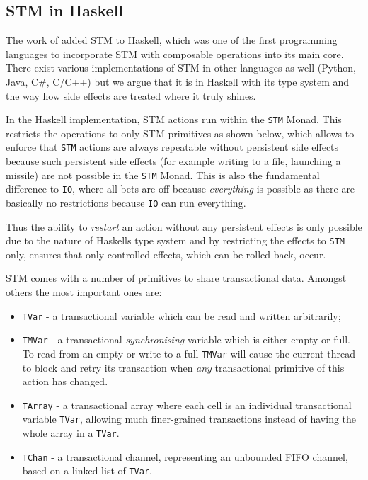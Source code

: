 \subsection{STM in Haskell}
The work of \cite{harris_composable_2005, harris_transactional_2006} added STM to Haskell, which was one of the first programming languages to incorporate STM with composable operations into its main core. There exist various implementations of STM in other languages as well (Python, Java, C\#, C/C++) but we argue that it is in Haskell with its type system and the way how side effects are treated where it truly shines.

In the Haskell implementation, STM actions run within the \texttt{STM} Monad. This restricts the operations to only STM primitives as shown below, which allows to enforce that \texttt{STM} actions are always repeatable without persistent side effects because such persistent side effects (for example writing to a file, launching a missile) are not possible in the \texttt{STM} Monad. This is also the fundamental difference to \texttt{IO}, where all bets are off because \textit{everything} is possible as there are basically no restrictions because \texttt{IO} can run everything.

Thus the ability to \textit{restart} an action without any persistent effects is only possible due to the nature of Haskells type system and by restricting the effects to \texttt{STM} only, ensures that only controlled effects, which can be rolled back, occur.

STM comes with a number of primitives to share transactional data. Amongst others the most important ones are:

\begin{itemize}
	\item \texttt{TVar} - a transactional variable which can be read and written arbitrarily;
	\item \texttt{TMVar} - a transactional \textit{synchronising} variable which is either empty or full. To read from an empty or write to a full \texttt{TMVar} will cause the current thread to block and retry its transaction when \textit{any} transactional primitive of this action has changed.
	\item \texttt{TArray} - a transactional array where each cell is an individual transactional variable \texttt{TVar}, allowing much finer-grained transactions instead of having the whole array in a \texttt{TVar}.
	\item \texttt{TChan} - a transactional channel, representing an unbounded FIFO channel, based on a linked list of \texttt{TVar}.
\end{itemize}

